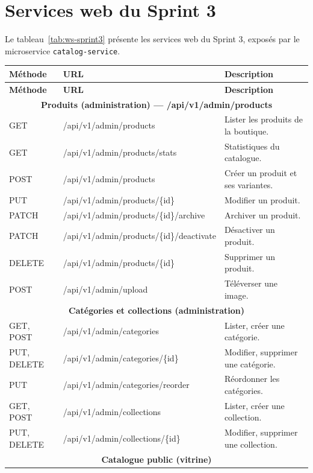 \section{Services web du Sprint 3}
Le tableau~\ref{tab:ws-sprint3} présente les services web du Sprint 3, exposés par le microservice \texttt{catalog-service}.
\renewcommand{\arraystretch}{1.15}
\setlength{\tabcolsep}{4pt}
\begin{longtable}{|p{1.5cm}|p{6.8cm}|p{6.2cm}|}
\hline
\textbf{Méthode} & \textbf{URL} & \textbf{Description} \\
\hline
\endfirsthead
\hline
\textbf{Méthode} & \textbf{URL} & \textbf{Description} \\
\hline
\endhead
\multicolumn{3}{|c|}{\textbf{Produits (administration) --- /api/v1/admin/products}} \\
\hline
GET & /api/v1/admin/products & Lister les produits de la boutique. \\
\hline
GET & /api/v1/admin/products/stats & Statistiques du catalogue. \\
\hline
POST & /api/v1/admin/products & Créer un produit et ses variantes. \\
\hline
PUT & /api/v1/admin/products/\{id\} & Modifier un produit. \\
\hline
PATCH & /api/v1/admin/products/\{id\}/archive & Archiver un produit. \\
\hline
PATCH & /api/v1/admin/products/\{id\}/deactivate & Désactiver un produit. \\
\hline
DELETE & /api/v1/admin/products/\{id\} & Supprimer un produit. \\
\hline
POST & /api/v1/admin/upload & Téléverser une image. \\
\hline
\multicolumn{3}{|c|}{\textbf{Catégories et collections (administration)}} \\
\hline
GET, POST & /api/v1/admin/categories & Lister, créer une catégorie. \\
\hline
PUT, DELETE & /api/v1/admin/categories/\{id\} & Modifier, supprimer une catégorie. \\
\hline
PUT & /api/v1/admin/categories/reorder & Réordonner les catégories. \\
\hline
GET, POST & /api/v1/admin/collections & Lister, créer une collection. \\
\hline
PUT, DELETE & /api/v1/admin/collections/\{id\} & Modifier, supprimer une collection. \\
\hline
\multicolumn{3}{|c|}{\textbf{Catalogue public (vitrine)}} \\

\end{longtable}
